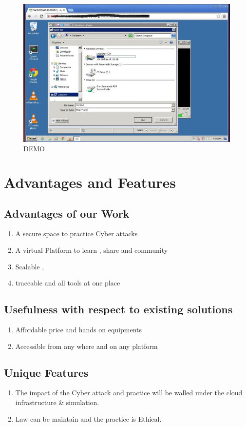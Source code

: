 \documentclass[12pt,a4paper,final,oneside]{report}
\begin{document}
	\noindent \begin{figure}[h!]
		\centering \includegraphics[width=0.685\linewidth,angle=0]{demo.jpg}
	\caption{DEMO}
	\end{figure}
	

\newpage
\chapter{Advantages and Features}
\section{Advantages of our Work}
\begin{enumerate}
\item A secure space to practice Cyber attacks
\item A virtual Platform to learn , share and community
\item Scalable , 
\item traceable and all tools at one place
\end{enumerate}
\section{Usefulness with respect to existing solutions }
\begin{enumerate}
\item Affordable price and hands on equipments 
\item Accessible from any where and on any platform
\end{enumerate}
\section{Unique Features}
\begin{enumerate}
\item The impact of the Cyber attack and practice will be walled under the cloud infrastructure \& simulation.
\item Law can be maintain and the practice is Ethical.
\end{enumerate}
\end{document}

